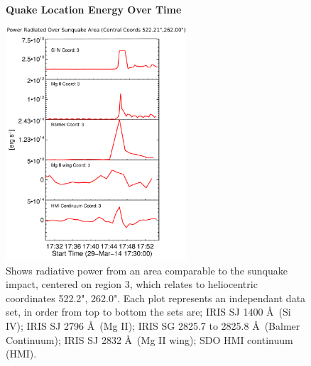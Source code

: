 \begin{figure}[H]
  \begin{center}
  \textbf{Quake Location Energy Over Time}\par\medskip
  \includegraphics[width=0.6\textwidth]{29-Mar-14-Ribbon-Area-3-Sunquake-Area-Power-Ladder}
  \end{center}
  \caption{Shows radiative power from an area comparable to the sunquake impact, centered on region 3, which relates to heliocentric coordinates 522.2", 262.0". Each plot represents an independant data set, in order from top to bottom the sets are; IRIS SJ 1400 \AA\ (Si IV); IRIS SJ 2796 \AA\ (Mg II); IRIS SG  2825.7 to 2825.8 \AA\ (Balmer Continuum); IRIS SJ 2832 \AA\ (Mg II wing); SDO HMI continuum (HMI).}\label{plot3}
\end{figure}

